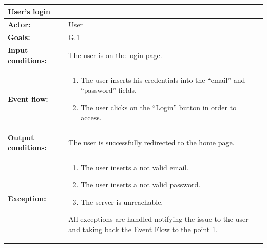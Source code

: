 \begin{tabular} { p{5cm} p{8cm} } 
\textbf{User's login} & \\
\hline
\textbf{Actor:} & User \\ 
\textbf{Goals:} & G.1 \\ 
\textbf{Input conditions:} & The user is on the login page. \\
\textbf{Event flow:} & \begin{enumerate}
				\item
				The user inserts his credentials into the “email” and “password” fields.
				\item
				The user clicks on the “Login” button in order to access.
			\end{enumerate} \\ 
\textbf{Output conditions:} & The user is successfully redirected to the
home page.\\ 
\textbf{Exception:} & \begin{enumerate}
				\item
				The user inserts a not valid email.
				\item
				The user inserts a not valid password.
				\item
				The server is unreachable.
			\end{enumerate}
All exceptions are handled notifying the issue to the user and taking back the Event Flow to the point 1. \\
\hline
\end{tabular}


